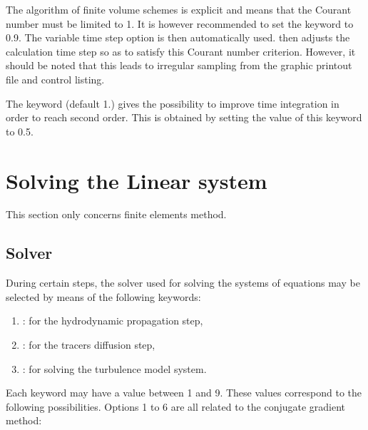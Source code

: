  The algorithm of finite volume schemes is explicit and means that the Courant number must be limited to 1. It is however recommended to set the keyword  to 0.9. The variable time step option is then automatically used.  then adjusts the calculation time step so as to satisfy this Courant number criterion. However, it should be noted that this leads to irregular sampling from the graphic printout file and control listing.

 The keyword  (default 1.) gives the possibility to improve time integration in order to reach second order. This is obtained by setting the value of this keyword to 0.5.


\section{  Solving the Linear system}

This section only concerns finite elements method. 
\subsection{ Solver}

 During certain steps, the solver used for solving the systems of equations may be selected by means of the following keywords:

\begin{enumerate}
\item  {}: for the hydrodynamic propagation step,

\item  {}: for the tracers diffusion step,

\item  {}: for solving the turbulence model system.
\end{enumerate}

 Each keyword may have a value between 1 and 9. These values correspond to the following possibilities. Options 1 to 6 are all related to the conjugate gradient method:

